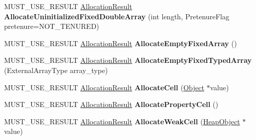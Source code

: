 \begin{DoxyCompactItemize}
\item 
M\+U\+S\+T\+\_\+\+U\+S\+E\+\_\+\+R\+E\+S\+U\+LT \hyperlink{classv8_1_1internal_1_1_allocation_result}{Allocation\+Result} {\bfseries Allocate\+Uninitialized\+Fixed\+Double\+Array} (int length, Pretenure\+Flag pretenure=N\+O\+T\+\_\+\+T\+E\+N\+U\+R\+ED)\hypertarget{classv8_1_1internal_1_1_heap_a486501db6f76fc74641499c994ce8f9b}{}\label{classv8_1_1internal_1_1_heap_a486501db6f76fc74641499c994ce8f9b}

\item 
M\+U\+S\+T\+\_\+\+U\+S\+E\+\_\+\+R\+E\+S\+U\+LT \hyperlink{classv8_1_1internal_1_1_allocation_result}{Allocation\+Result} {\bfseries Allocate\+Empty\+Fixed\+Array} ()\hypertarget{classv8_1_1internal_1_1_heap_aed537d7ace48d22255090d3c69d9309a}{}\label{classv8_1_1internal_1_1_heap_aed537d7ace48d22255090d3c69d9309a}

\item 
M\+U\+S\+T\+\_\+\+U\+S\+E\+\_\+\+R\+E\+S\+U\+LT \hyperlink{classv8_1_1internal_1_1_allocation_result}{Allocation\+Result} {\bfseries Allocate\+Empty\+Fixed\+Typed\+Array} (External\+Array\+Type array\+\_\+type)\hypertarget{classv8_1_1internal_1_1_heap_a10746a9cb6340fbf94b86a1222712706}{}\label{classv8_1_1internal_1_1_heap_a10746a9cb6340fbf94b86a1222712706}

\item 
M\+U\+S\+T\+\_\+\+U\+S\+E\+\_\+\+R\+E\+S\+U\+LT \hyperlink{classv8_1_1internal_1_1_allocation_result}{Allocation\+Result} {\bfseries Allocate\+Cell} (\hyperlink{classv8_1_1internal_1_1_object}{Object} $\ast$value)\hypertarget{classv8_1_1internal_1_1_heap_a2fd1ecee160b8b81c053f4834b590518}{}\label{classv8_1_1internal_1_1_heap_a2fd1ecee160b8b81c053f4834b590518}

\item 
M\+U\+S\+T\+\_\+\+U\+S\+E\+\_\+\+R\+E\+S\+U\+LT \hyperlink{classv8_1_1internal_1_1_allocation_result}{Allocation\+Result} {\bfseries Allocate\+Property\+Cell} ()\hypertarget{classv8_1_1internal_1_1_heap_ad0f4946e5d884da7f54ca082328d35f4}{}\label{classv8_1_1internal_1_1_heap_ad0f4946e5d884da7f54ca082328d35f4}

\item 
M\+U\+S\+T\+\_\+\+U\+S\+E\+\_\+\+R\+E\+S\+U\+LT \hyperlink{classv8_1_1internal_1_1_allocation_result}{Allocation\+Result} {\bfseries Allocate\+Weak\+Cell} (\hyperlink{classv8_1_1internal_1_1_heap_object}{Heap\+Object} $\ast$value)\hypertarget{classv8_1_1internal_1_1_heap_a7a2e0934c04d7c15e0b1bbe26da37f9e}{}\label{classv8_1_1internal_1_1_heap_a7a2e0934c04d7c15e0b1bbe26da37f9e}


\end{DoxyCompactItemize}
